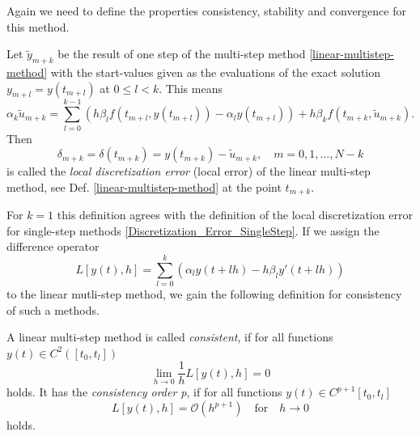 	Again we need to define the properties consistency, stability and convergence for this method.
	\begin{definition}
		Let $\tilde{y}_{m+k}$ be the result of one step of the multi-step method \eqref{linear-multistep-method} with the start-values given as the evaluations of the exact solution $y_{m+l} = y(t_{m+l})$ at $0 \leq l < k$. This means
		\begin{displaymath}
			\alpha_k \tilde{u}_{m+k} = \sum_{l=0}^{k-1} \left( h \beta_l f(t_{m+l}, y(t_{m+l})) - \alpha_l y(t_{m+l}) \right) + h \beta_k f(t_{m+k}, \tilde{u}_{m+k}) .
		\end{displaymath}
		Then
		\begin{displaymath}
			\delta_{m+k} = \delta(t_{m+k}) = y(t_{m+k}) - \tilde{u}_{m+k}, \quad m=0,1,...,N-k
		\end{displaymath}
		is called the \emph{local discretization error} (local error) of the linear multi-step method, see Def. \ref{linear-multistep-method} at the point $t_{m+k}$.
	\end{definition}
	
	For $k=1$ this definition agrees with the definition of the local discretization error for single-step methods \ref{Discretization_Error_SingleStep}.
	If we assign the difference operator
	\begin{equation}
		L[y(t),h] = \sum_{l=0}^{k} \left( \alpha_l y(t+lh) - h \beta_l y'(t+lh) \right)
	\end{equation}
	to the linear mutli-step method, we gain the following definition for consistency of such a methods.
	
	\begin{definition}
		A linear multi-step method is called %
		\emph{consistent}, if for all functions $y(t) \in C^2([t_0,t_l])$
		\begin{displaymath}
			\lim\limits_{h \to 0} \frac{1}{h} L[y(t),h] = 0
		\end{displaymath}
		holds. It has the \emph{consistency order p}, if for all functions $y(t) \in C^{p+1}[t_0, t_l]$
		\begin{displaymath}
			L[y(t),h] = \mathcal{O}(h^{p+1}) \quad \text{for} \quad h \to 0
		\end{displaymath}
		holds.
	\end{definition}

